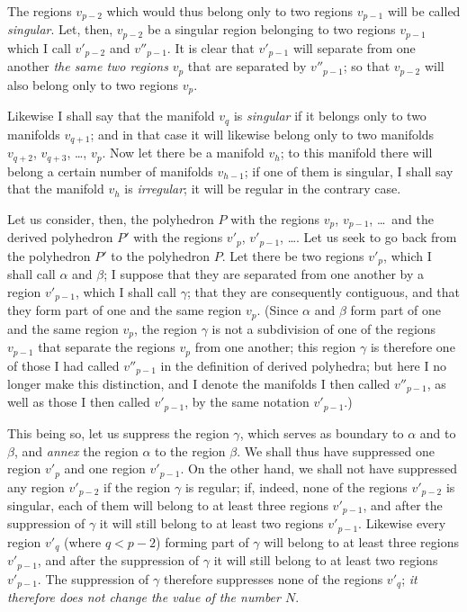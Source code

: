 \documentclass{article}
\begin{document}
The regions $v_{p-2}$ which would thus belong only to two regions $v_{p-1}$ will be called \emph{singular}. Let, then, $v_{p-2}$ be a singular region belonging to two regions $v_{p-1}$ which I call $v'_{p-2}$ and $v''_{p-1}$. It is clear that $v'_{p-1}$ will separate from one another \emph{the same two regions} $v_{p}$ that are separated by $v''_{p-1}$; so that $v_{p-2}$ will also belong only to two regions $v_{p}$.

Likewise I shall say that the manifold $v_{q}$ is \emph{singular} if it belongs only to two manifolds $v_{q+1}$; and in that case it will likewise belong only to two manifolds $v_{q+2}$, $v_{q+3}$, \ldots, $v_{p}$.
Now let there be a manifold $v_{h}$; to this manifold there will belong a certain number of manifolds $v_{h-1}$; if one of them is singular, I shall say that the manifold $v_{h}$ is \emph{irregular}; it will be regular in the contrary case.

Let us consider, then, the polyhedron $P$ with the regions $v_{p}$, $v_{p-1}$, \ldots\ and the derived polyhedron $P'$ with the regions $v'_{p}$, $v'_{p-1}$, \ldots. Let us seek to go back from the polyhedron $P'$ to the polyhedron $P$. Let there be two regions $v'_{p}$, which I shall call $\alpha$ and $\beta$; I suppose that they are separated from one another by a region $v'_{p-1}$, which I shall call $\gamma$; that they are consequently contiguous, and that they form part of one and the same region $v_{p}$. (Since $\alpha$ and $\beta$ form part of one and the same region $v_{p}$, the region $\gamma$ is not a subdivision of one of the regions $v_{p-1}$ that separate the regions $v_{p}$ from one another; this region $\gamma$ is therefore one of those I had called $v''_{p-1}$ in the definition of derived polyhedra; but here I no longer make this distinction, and I denote the manifolds I then called $v''_{p-1}$, as well as those I then called $v'_{p-1}$, by the same notation $v'_{p-1}$.)

This being so, let us suppress the region $\gamma$, which serves as boundary to $\alpha$ and to $\beta$, and \emph{annex} the region $\alpha$ to the region $\beta$. We shall thus have suppressed one region $v'_{p}$ and one region $v'_{p-1}$. On the other hand, we shall not have suppressed any region $v'_{p-2}$ if the region $\gamma$ is regular; if, indeed, none of the regions $v'_{p-2}$ is singular, each of them will belong to at least three regions $v'_{p-1}$, and after the suppression of $\gamma$ it will still belong to at least two regions $v'_{p-1}$. Likewise every region $v'_{q}$ (where $q < p - 2$) forming part of $\gamma$ will belong to at least three regions $v'_{p-1}$, and after the suppression of $\gamma$ it will still belong to at least two regions $v'_{p-1}$. The suppression of $\gamma$ therefore suppresses none of the regions $v'_{q}$; \emph{it therefore does not change the value of the number $N$}.
\end{document}
